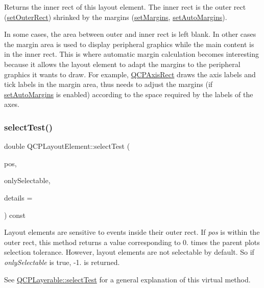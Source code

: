 Returns the inner rect of this layout element. The inner rect is the outer rect (\hyperlink{class_q_c_p_layout_element_a38975ea13e36de8e53391ce41d94bc0f}{set\+Outer\+Rect}) shrinked by the margins (\hyperlink{class_q_c_p_layout_element_a8f450b1f3f992ad576fce2c63d8b79cf}{set\+Margins}, \hyperlink{class_q_c_p_layout_element_accfda49994e3e6d51ed14504abf9d27d}{set\+Auto\+Margins}).

In some cases, the area between outer and inner rect is left blank. In other cases the margin area is used to display peripheral graphics while the main content is in the inner rect. This is where automatic margin calculation becomes interesting because it allows the layout element to adapt the margins to the peripheral graphics it wants to draw. For example, \hyperlink{class_q_c_p_axis_rect}{Q\+C\+P\+Axis\+Rect} draws the axis labels and tick labels in the margin area, thus needs to adjust the margins (if \hyperlink{class_q_c_p_layout_element_accfda49994e3e6d51ed14504abf9d27d}{set\+Auto\+Margins} is enabled) according to the space required by the labels of the axes. \mbox{\label{class_q_c_p_layout_element_ae97f483cccedadbf18ea4525ef240ee4}} 
\subsubsection{\texorpdfstring{select\+Test()}{selectTest()}}
{\footnotesize\ttfamily double Q\+C\+P\+Layout\+Element\+::select\+Test (\begin{DoxyParamCaption}\item[{const Q\+PointF \&}]{pos,  }\item[{bool}]{only\+Selectable,  }\item[{Q\+Variant $\ast$}]{details = {} }\end{DoxyParamCaption}) const\hspace{0.3cm}{\ttfamily [virtual]}}

Layout elements are sensitive to events inside their outer rect. If {\itshape pos} is within the outer rect, this method returns a value corresponding to 0. times the parent plot\textquotesingle{}s selection tolerance. However, layout elements are not selectable by default. So if {\itshape only\+Selectable} is true, -\/1. is returned.

See \hyperlink{class_q_c_p_layerable_a04db8351fefd44cfdb77958e75c6288e}{Q\+C\+P\+Layerable\+::select\+Test} for a general explanation of this virtual method.

